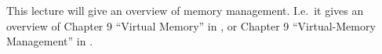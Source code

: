 This lecture will give an overview of memory management.
I.e.\ it gives an overview of Chapter 9 ``Virtual Memory'' in 
\cite{Silberschatz2013intl,Silberschatz2013osc}, or Chapter 9 ``Virtual-Memory 
Management'' in \cite{Silberschatz2009osc}.
